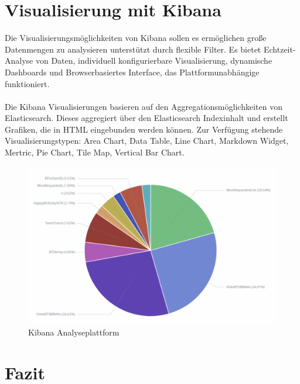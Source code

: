 \section{Visualisierung mit Kibana}
Die Visualisierungsmöglichkeiten von Kibana \cite{kibana} sollen es ermöglichen große Datenmengen zu analysieren unterstützt durch flexible Filter. Es bietet Echtzeit-Analyse von Daten, individuell konfigurierbare Visualisierung, dynamische Dashboards und Browserbasiertes Interface, das Plattformunabhängige funktioniert.\\\\
Die Kibana Visualisierungen basieren auf den Aggregationsmöglichkeiten von Elasticsearch. Dieses aggregiert über den Elasticsearch Indexinhalt und erstellt Grafiken, die in HTML eingebunden werden können. Zur Verfügung stehende Visualisierungstypen: Area Chart, Data Table, Line Chart, Markdown Widget, Mertric, Pie Chart, Tile Map, Vertical Bar Chart.
\begin{figure}[htbp!]
  \includegraphics[scale=0.4]{material/architecture/kibana.png}
  \caption{Kibana Analyseplattform} 
  \label{fig:Kibana}
\end{figure}

\section{Fazit}
